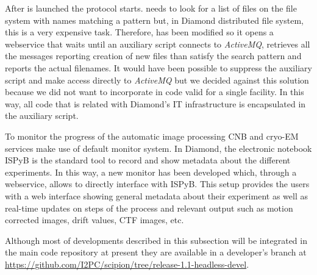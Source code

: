 
After \scipion is launched the  protocol starts.  needs to look for a list of files on the file system with names matching a pattern but, in Diamond distributed file system, this is a very expensive task. Therefore,  has been modified so it opens a webservice that waits until an auxiliary script connects to \emph{ActiveMQ}, retrieves all the  messages reporting creation of new files than satisfy the search pattern and reports the actual filenames. It would have been possible to suppress the auxiliary script and make  access directly to \emph{ActiveMQ} but we decided against this solution because we did not want to incorporate in \scipion code valid for a single facility. In this way, all code that is related with Diamond's IT infrastructure is encapsulated in the auxiliary script. 

To monitor the progress of the automatic image processing CNB and \scilifelab cryo-EM services make use of \scipion default monitor system. In Diamond, the electronic notebook ISPyB is the standard tool to record and show metadata about the different experiments. In this way, a new monitor has been developed which, through a webservice, allows \scipion to directly interface with ISPyB.  This setup provides the users with a web interface showing general metadata about their experiment as well as  real-time updates on steps of the process and relevant output such as motion corrected images, drift values, CTF images, etc.

Although most of developments described in this subsection will be integrated in the main \scipion code repository at present they are available in a developer's branch  at \url{https://github.com/I2PC/scipion/tree/release-1.1-headless-devel}.
